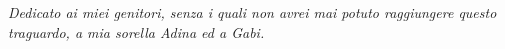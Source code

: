 
\cleardoublepage
{}
\thispagestyle{empty}

\vspace*{3cm}


\medskip

\begin{center}
\textit{Dedicato ai miei genitori, senza i quali non avrei mai potuto raggiungere questo traguardo, a mia sorella Adina ed a Gabi.}\\
\end{center}

